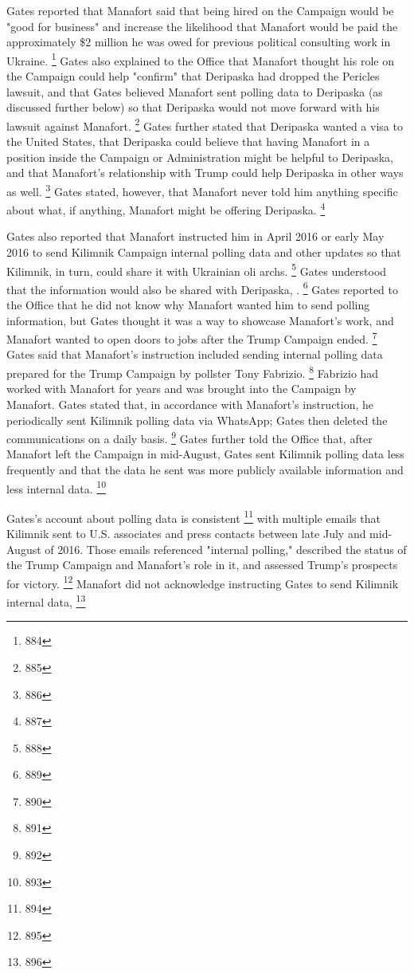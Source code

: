 Gates reported that Manafort said that being hired on the Campaign would be "good for business" and increase the likelihood that Manafort would be paid the approximately \$2 million he was owed for previous political consulting work in Ukraine.%
\footnote{884}
Gates also explained to the Office that Manafort thought his role on the Campaign could help "confirm" that Deripaska had dropped the Pericles lawsuit, and that Gates believed Manafort sent polling data to Deripaska (as discussed further below) so that Deripaska would not move forward with his lawsuit against Manafort.%
\footnote{885}
Gates further stated that Deripaska wanted a visa to the United States, that Deripaska could believe that having Manafort in a position inside the Campaign or Administration might be helpful to Deripaska, and that Manafort's relationship with Trump could help Deripaska in other ways as well.%
\footnote{886}
Gates stated, however, that Manafort never told him anything specific about what, if anything, Manafort might be offering Deripaska.%
\footnote{887}

Gates also reported that Manafort instructed him in April 2016 or early May 2016 to send Kilimnik Campaign internal polling data and other updates so that Kilimnik, in turn, could share it with Ukrainian oli archs.%
\footnote{888}
Gates understood that the information would also be shared with Deripaska,
.%
\footnote{889}
Gates reported to the Office that he did not know why Manafort wanted him to send polling information, but Gates thought it was a way to showcase Manafort's work, and Manafort wanted to open doors to jobs after the Trump Campaign ended.%
\footnote{890}
Gates said that Manafort's instruction included sending internal polling data prepared for the Trump Campaign by pollster Tony Fabrizio.%
\footnote{891}
Fabrizio had worked with Manafort for years and was brought into the Campaign by Manafort.
Gates stated that, in accordance with Manafort's instruction, he periodically sent Kilimnik polling data via WhatsApp; Gates then deleted the communications on a daily basis.%
\footnote{892}
Gates further told the Office that, after Manafort left the Campaign in mid-August, Gates sent Kilimnik polling data less frequently and that the data he sent was more publicly available information and less internal data.%
\footnote{893}

Gates's account about polling data is consistent
\footnote{894}
with multiple emails that Kilimnik sent to U.S. associates and press contacts between late July and mid-August of 2016.
Those emails referenced "internal polling," described the status of the Trump Campaign and Manafort's role in it, and assessed Trump's prospects for victory.%
\footnote{895}
Manafort did not acknowledge instructing Gates to send Kilimnik internal data,
\footnote{896}

